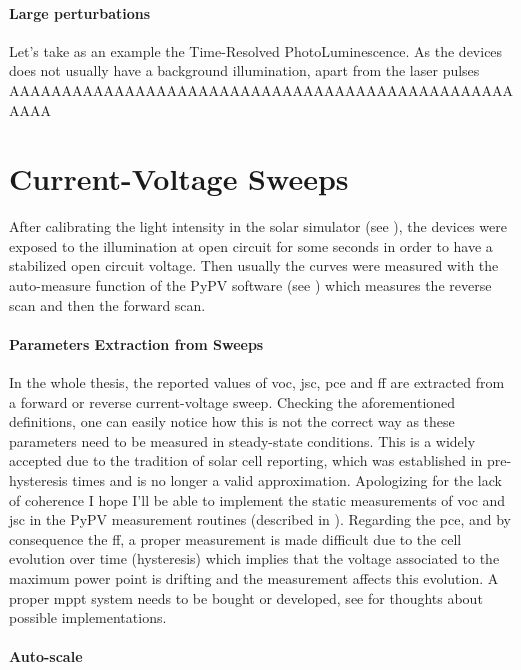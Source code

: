 \paragraph{Large perturbations} Let's take as an example the Time-Resolved PhotoLuminescence. As the devices does not usually have a background illumination, apart from the laser pulses AAAAAAAAAAAAAAAAAAAAAAAAAAAAAAAAAAAAAAAAAAAAAAAAAAAA





\section{Current-Voltage Sweeps}

After calibrating the light intensity in the solar simulator (see ), the devices were exposed to the illumination at open circuit for some seconds in order to have a stabilized open circuit voltage. Then usually the curves were measured with the auto-measure function of the PyPV software (see ) which measures the reverse scan and then the forward scan.

\paragraph{Parameters Extraction from Sweeps}
In the whole thesis, the reported values of \gls{voc}, \gls{jsc}, \gls{pce} and \gls{ff} are extracted from a forward or reverse current-voltage sweep. Checking the aforementioned definitions, one can easily notice how this is not the correct way as these parameters need to be measured in steady-state conditions. This is a widely accepted due to the tradition of solar cell reporting, which was established in pre-hysteresis times and is no longer a valid approximation. Apologizing for the lack of coherence I hope I'll be able to implement the static measurements of \gls{voc} and \gls{jsc} in the PyPV measurement routines (described in ). Regarding the \gls{pce}, and by consequence the \gls{ff}, a proper measurement is made difficult due to the cell evolution over time (hysteresis) which implies that the voltage associated to the maximum power point is drifting and the measurement affects this evolution. A proper \gls{mppt} system needs to be bought or developed, see  for thoughts about possible implementations.

\paragraph{Auto-scale}\label{autoscale}

